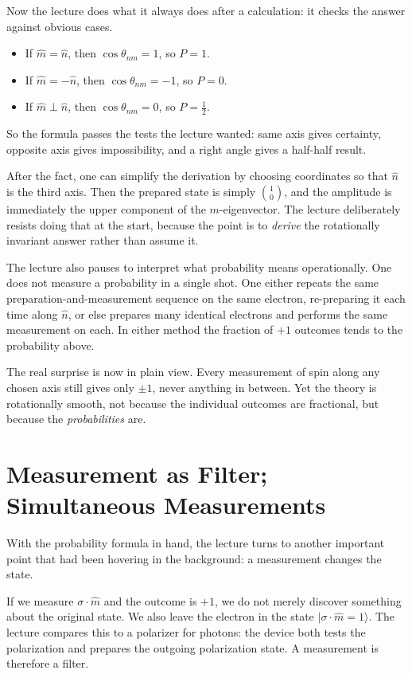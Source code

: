 Now the lecture does what it always does after a calculation: it checks the answer against obvious cases.
\begin{itemize}
\item If \(\hat m=\hat n\), then \(\cos\theta_{nm}=1\), so \(P=1\).
\item If \(\hat m=-\hat n\), then \(\cos\theta_{nm}=-1\), so \(P=0\).
\item If \(\hat m\perp\hat n\), then \(\cos\theta_{nm}=0\), so \(P=\tfrac12\).
\end{itemize}
So the formula passes the tests the lecture wanted: same axis gives certainty, opposite axis gives impossibility, and a right angle gives a half-half result.

\begin{remark}
After the fact, one can simplify the derivation by choosing coordinates so that \(\hat n\) is the third axis. Then the prepared state is simply \(\binom{1}{0}\), and the amplitude is immediately the upper component of the \(m\)-eigenvector. The lecture deliberately resists doing that at the start, because the point is to \emph{derive} the rotationally invariant answer rather than assume it.
\end{remark}

The lecture also pauses to interpret what probability means operationally. One does not measure a probability in a single shot. One either repeats the same preparation-and-measurement sequence on the same electron, re-preparing it each time along \(\hat n\), or else prepares many identical electrons and performs the same measurement on each. In either method the fraction of \(+1\) outcomes tends to the probability above.

The real surprise is now in plain view. Every measurement of spin along any chosen axis still gives only \(\pm1\), never anything in between. Yet the theory is rotationally smooth, not because the individual outcomes are fractional, but because the \emph{probabilities} are.

\section{Measurement as Filter; Simultaneous Measurements}

With the probability formula in hand, the lecture turns to another important point that had been hovering in the background: a measurement changes the state.

If we measure \(\sigma\cdot\hat m\) and the outcome is \(+1\), we do not merely discover something about the original state. We also leave the electron in the state \(|\sigma\cdot\hat m=1\rangle\). The lecture compares this to a polarizer for photons: the device both tests the polarization and prepares the outgoing polarization state. A measurement is therefore a filter.

